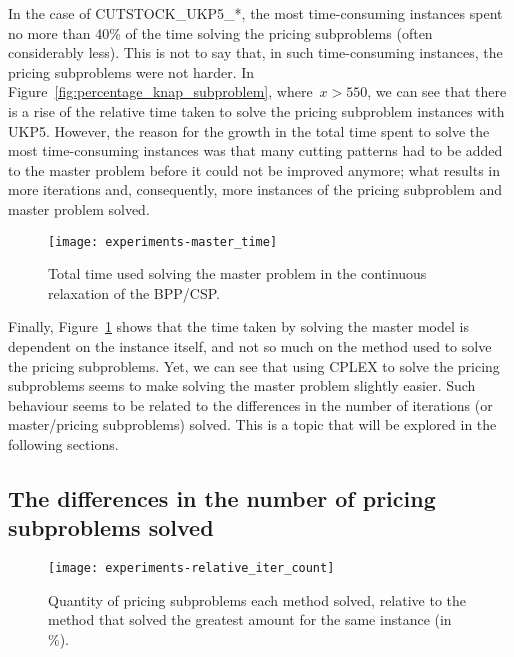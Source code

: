 In the case of CUTSTOCK\_UKP5\_*, the most time-consuming instances spent no more than 40\% of the time solving the pricing subproblems (often considerably less).
This is not to say that, in such time-consuming instances, the pricing subproblems were not harder.
In Figure~\ref{fig:percentage_knap_subproblem}, where~\(x > 550\), we can see that there is a rise of the relative time taken to solve the pricing subproblem instances with UKP5.
However, the reason for the growth in the total time spent to solve the most time-consuming instances was that many cutting patterns had to be added to the master problem before it could not be improved anymore; what results in more iterations and, consequently, more instances of the pricing subproblem and master problem solved.

\begin{figure}[h]
\caption{Total time used solving the master problem in the continuous relaxation of the BPP/CSP.}
\begin{center}
\texttt{[image: experiments-master\_time]}
\end{center}
\label{fig:master_time}
\end{figure}

Finally, Figure~\ref{fig:master_time} shows that the time taken by solving the master model is dependent on the instance itself, and not so much on the method used to solve the pricing subproblems.
Yet, we can see that using CPLEX to solve the pricing subproblems seems to make solving the master problem slightly easier.
Such behaviour seems to be related to the differences in the number of iterations (or master/pricing subproblems) solved.
This is a topic that will be explored in the following sections.

\subsection{The differences in the number of pricing subproblems solved}

\begin{figure}[h]
\caption{Quantity of pricing subproblems each method solved, relative to the method that solved the greatest amount for the same instance (in \%).}
\begin{center}
\texttt{[image: experiments-relative\_iter\_count]}
\end{center}
\label{fig:relative_iter_count}
\end{figure}

